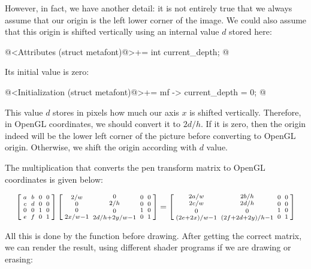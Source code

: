 {{{{{However, in fact, we have another detail: it is not entirely true that
we always assume that our origin is the left lower corner of the
image. We could also assume that this origin is shifted vertically
using an internal value $d$ stored here:

\iniciocodigo
@<Attributes (struct metafont)@>+=
int current_depth;
@
\fimcodigo

Its initial value is zero:

\iniciocodigo
@<Initialization (struct metafont)@>+=
mf -> current_depth = 0;
@
\fimcodigo

This value $d$ stores in pixels how much our axis $x$ is shifted
vertically. Therefore, in OpenGL coordinates, we should convert it to
$2d/h$. If it is zero, then the origin indeed will be the lower left
corner of the picture before converting to OpenGL origin. Otherwise,
we shift the origin according with $d$ value.

The multiplication that converts the pen transform matrix to OpenGL
coordinates is given below:

$$
\left[{{a \atop c}\atop
      {0\atop e}}{{b \atop d}\atop {0 \atop
      f}}{{0\atop 0}\atop{1 \atop 0}}{{0 \atop 0}\atop{0\atop
      1}}\right]
\left[{{2/w \atop 0}\atop
      {0\atop 2x/w-1}}{{0 \atop 2/h}\atop {0 \atop
      2d/h+2y/w-1}}{{0\atop 0}\atop{1 \atop 0}}{{0 \atop 0}\atop{0\atop
      1}}\right]=
\left[{{2a/w \atop 2c/w}\atop
      {0\atop (2e+2x)/w-1}}{{2b/h \atop 2d/h}\atop {0 \atop
      (2f+2d+2y)/h-1}}{{0\atop 0}\atop{1 \atop 0}}{{0 \atop 0}\atop{0\atop
      1}}\right]
$$


All this is done by the function  before
drawing. After getting the correct matrix, we can render the result,
using different shader programs if we are drawing or erasing:

}}}}}
